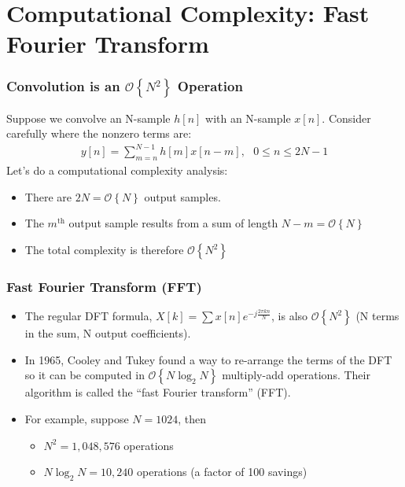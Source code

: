 \documentclass{beamer}
\begin{document}
\section[FFT]{Computational Complexity: Fast Fourier Transform}
\setcounter{subsection}{1}

\begin{frame}
  \frametitle{Convolution is an $\mathcal{O}\left\{N^2\right\}$ Operation}

  Suppose we convolve an N-sample $h[n]$ with an N-sample $x[n]$.
  Consider carefully where the nonzero terms are:
  \begin{align*}
    y[n] = \sum_{m=n}^{N-1} h[m]x[n-m],~~~0\le n\le 2N-1
  \end{align*}
  Let's do a computational complexity analysis:
  \begin{itemize}
  \item There are $2N=\mathcal{O}\left\{N\right\}$ output samples.
  \item The $m^{\text{th}}$ output sample results from a sum of length
    $N-m=\mathcal{O}\left\{N\right\}$
  \item The total complexity is therefore $\mathcal{O}\left\{N^2\right\}$
  \end{itemize}
\end{frame}

\begin{frame}
  \frametitle{Fast Fourier Transform (FFT)}

  \begin{itemize}
  \item The regular DFT formula, $X[k]=\sum
    x[n]e^{-j\frac{2\pi{kn}}{N}}$, is also
    $\mathcal{O}\left\{N^2\right\}$ (N terms in the sum, N output coefficients).
  \item In 1965, Cooley and Tukey found a way to re-arrange the terms
    of the DFT so it can be computed in
    $\mathcal{O}\left\{N\log_2{N}\right\}$ multiply-add operations.
    Their algorithm is called the ``fast Fourier transform'' (FFT).
  \item For example, suppose $N=1024$, then
    \begin{itemize}
    \item $N^2=1,048,576$ operations
    \item $N\log_2 N=10,240$ operations (a factor of 100 savings)
    \end{itemize}
  \end{itemize}
\end{frame}
\end{document}
